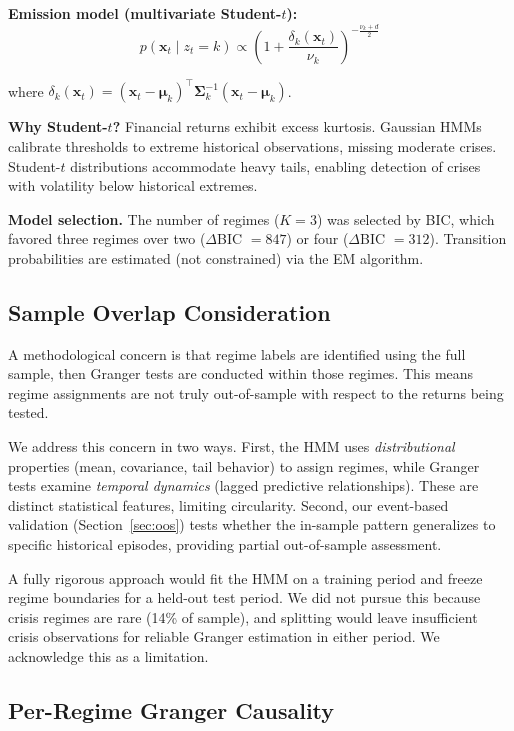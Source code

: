 \documentclass[sigconf]{acmart}
\begin{document}
\textbf{Emission model (multivariate Student-$t$):}
\begin{equation}
p(\mathbf{x}_t \mid z_t = k) \propto \left(1 + \frac{\delta_k(\mathbf{x}_t)}{\nu_k}\right)^{-\frac{\nu_k+d}{2}}
\end{equation}

where $\delta_k(\mathbf{x}_t) = (\mathbf{x}_t - \boldsymbol{\mu}_k)^\top\boldsymbol{\Sigma}_k^{-1}(\mathbf{x}_t - \boldsymbol{\mu}_k)$.

\textbf{Why Student-$t$?} Financial returns exhibit excess kurtosis. Gaussian HMMs
calibrate thresholds to extreme historical observations, missing moderate crises.
Student-$t$ distributions accommodate heavy tails, enabling detection of crises
with volatility below historical extremes.

\textbf{Model selection.} The number of regimes ($K=3$) was selected by BIC, which
favored three regimes over two ($\Delta$BIC $= 847$) or four ($\Delta$BIC $= 312$).
Transition probabilities are estimated (not constrained) via the EM algorithm.

\subsection{Sample Overlap Consideration}
\label{sec:overlap}

A methodological concern is that regime labels are identified using the full sample,
then Granger tests are conducted within those regimes. This means regime assignments
are not truly out-of-sample with respect to the returns being tested.

We address this concern in two ways. First, the HMM uses \emph{distributional}
properties (mean, covariance, tail behavior) to assign regimes, while Granger
tests examine \emph{temporal dynamics} (lagged predictive relationships). These
are distinct statistical features, limiting circularity. Second, our event-based
validation (Section~\ref{sec:oos}) tests whether the in-sample pattern generalizes
to specific historical episodes, providing partial out-of-sample assessment.

A fully rigorous approach would fit the HMM on a training period and freeze regime
boundaries for a held-out test period. We did not pursue this because crisis regimes
are rare (14\% of sample), and splitting would leave insufficient crisis observations
for reliable Granger estimation in either period. We acknowledge this as a limitation.

\subsection{Per-Regime Granger Causality}
\end{document}

